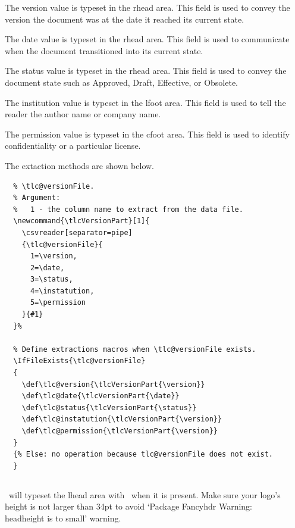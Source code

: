 \documentclass[12pt]{tlc-article}
\makeatletter
\def\tlcProduct{tlc-article}
\def\tlcA{\tlcDarkblue{\tlcProduct}}
\def\tlcLG{\tlcDarkblue{\tlc@logoFile}}
\makeatother
\begin{document}
\begin{description}[style=nextline]
  \item[version] The version value is typeset in the rhead area.  This field is
    used to convey the version the document was at the date it reached its
    current state.

  \item[date] The date value is typeset in the rhead area.  This field is used
    to communicate when the document transitioned into its current state.

  \item[status] The status value is typeset in the rhead area.  This field is
    used to convey the document state such as Approved, Draft, Effective, or
    Obsolete.

  \item[instatution] The institution value is typeset in the lfoot area.  This
    field is used to tell the reader the author name or company name.

  \item[permission]  The permission value is typeset in the cfoot area.  This
    field is used to identify confidentiality or a particular license. 

\end{description}

The extaction methods are shown below.
\begin{lstlisting}[basicstyle=\tiny]
  % Extract document status, document date and document version from
  % \tlc@versionFile.
  % Argument:
  %   1 - the column name to extract from the data file.
  \newcommand{\tlcVersionPart}[1]{
    \csvreader[separator=pipe]
    {\tlc@versionFile}{
      1=\version,
      2=\date,
      3=\status,
      4=\instatution,
      5=\permission
    }{#1}
  }%

  % Define extractions macros when \tlc@versionFile exists.
  \IfFileExists{\tlc@versionFile}
  { 
    \def\tlc@version{\tlcVersionPart{\version}}
    \def\tlc@date{\tlcVersionPart{\date}}
    \def\tlc@status{\tlcVersionPart{\status}}
    \def\tlc@instatution{\tlcVersionPart{\version}}
    \def\tlc@permission{\tlcVersionPart{\version}}
  }
  {% Else: no operation because tlc@versionFile does not exist. 
  }
\end{lstlisting}


\subsection{\tlcLG}
\tlcA\ will typeset the lhead area with \tlcLG\ when it is present. Make sure
your logo's height is not larger than 34pt to avoid `Package Fancyhdr Warning:
\\headheight is to small' warning.
\end{document}
